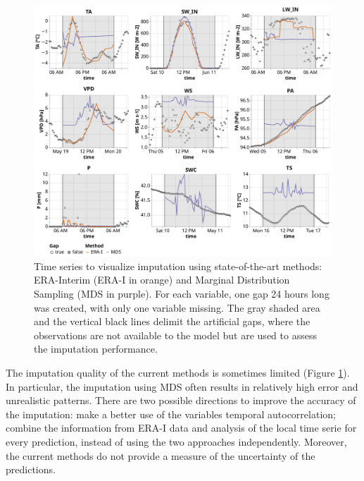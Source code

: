 \documentclass{article}
\newcommand{\imgwidth}{6in}
\begin{document}
\begin{figure}
    \centerline{\includegraphics[width=\imgwidth]{timeseries_sota}}
\caption{Time series to visualize imputation using state-of-the-art methods: ERA-Interim (ERA-I in orange) and Marginal Distribution Sampling (MDS in purple). For each variable, one gap 24 hours long was created, with only one variable missing. The gray shaded area and the vertical black lines delimit the artificial gaps, where the observations are not available to the model but are used to assess the imputation performance.}
\label{fig:ts_sota}
\end{figure}

The imputation quality of the current methods is sometimes limited (Figure \ref{fig:ts_sota}). In particular, the imputation using MDS often results in relatively high error and unrealistic patterns. There are two possible directions to improve the accuracy of the imputation:  make a better use of the variables temporal autocorrelation; combine the information from ERA-I data and analysis of the local time serie for every prediction, instead of using the two approaches independently. Moreover, the current methods do not provide a measure of the uncertainty of the predictions.
\end{document}
